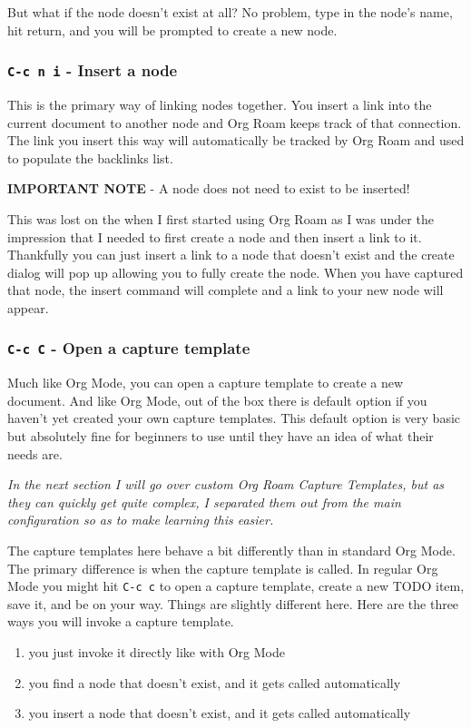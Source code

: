 \documentclass[11pt]{article}
\begin{document}
But what if the node doesn't exist at all? No problem, type in the node's name, hit return, and you will be prompted to create a new node.
\subsubsection*{\texttt{C-c n i} - Insert a node}
\label{sec:orgfad5523}

This is the primary way of linking nodes together. You insert a link into the current document to another node and Org Roam keeps track of that connection. The link you insert this way will automatically be tracked by Org Roam and used to populate the backlinks list.

\textbf{IMPORTANT NOTE} - A node does not need to exist to be inserted!

This was lost on the when I first started using Org Roam as I was under the impression that I needed to first create a node and then insert a link to it. Thankfully you can just insert a link to a node that doesn't exist and the create dialog will pop up allowing you to fully create the node. When you have captured that node, the insert command will complete and a link to your new node will appear.
\subsubsection*{\texttt{C-c C} - Open a capture template}
\label{sec:org936c9c0}

Much like Org Mode, you can open a capture template to create a new document. And like Org Mode, out of the box there is default option if you haven't yet created your own capture templates. This default option is very basic but absolutely fine for beginners to use until they have an idea of what their needs are.

\emph{In the next section I will go over custom Org Roam Capture Templates, but as they can quickly get quite complex, I separated them out from the main configuration so as to make learning this easier.}

The capture templates here behave a bit differently than in standard Org Mode. The primary difference is when the capture template is called. In regular Org Mode you might hit \texttt{C-c c} to open a capture template, create a new TODO item, save it, and be on your way. Things are slightly different here. Here are the three ways you will invoke a capture template.

\begin{enumerate}
\item you just invoke it directly like with Org Mode
\item you find a node that doesn't exist, and it gets called automatically
\item you insert a node that doesn't exist, and it gets called automatically
\end{enumerate}
\end{document}

